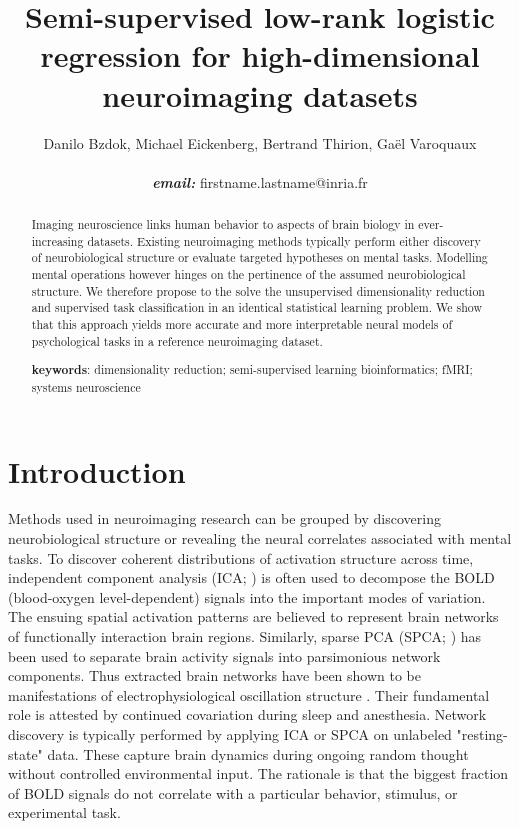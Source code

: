 \documentclass{article} %
\title{Semi-supervised low-rank logistic regression for
high-dimensional neuroimaging datasets}
\begin{document}
\maketitle

\author{Danilo Bzdok, Michael Eickenberg, Bertrand Thirion, Ga\"el
  Varoquaux \\\\\textbf{\textit{email:} }firstname.lastname@inria.fr}

\begin{abstract}
Imaging neuroscience links human behavior to aspects of brain
biology in ever-increasing datasets.
%
Existing neuroimaging methods typically perform either discovery of
neurobiological structure or evaluate targeted hypotheses on mental tasks.
%
Modelling mental operations however hinges
on the pertinence of the assumed neurobiological structure.
%
We therefore propose to the solve the unsupervised dimensionality reduction
and supervised task classification in
an identical statistical learning problem.
%
We show that this approach yields more accurate and more interpretable
neural models of psychological tasks in a reference neuroimaging dataset.
%

\textbf{keywords}: dimensionality reduction; semi-supervised learning
bioinformatics; fMRI; systems neuroscience

\end{abstract}


\section{Introduction}
%
Methods used in neuroimaging research can be grouped by discovering
neurobiological structure or revealing the neural correlates associated
with mental tasks.
To discover coherent distributions of activation structure across time,
independent component analysis (ICA; \cite{beckmann2005}) is often used
to decompose the BOLD (blood-oxygen level-dependent) signals into the
important modes of variation.
The ensuing spatial activation patterns are believed to represent
brain networks of
functionally interaction brain regions.
Similarly, sparse PCA (SPCA; \cite{varoqu2011}) has been used to
separate brain activity signals into parsimonious network components.
Thus extracted brain networks have been shown to be
manifestations of electrophysiological oscillation structure \cite{hipp15}.
Their fundamental role is
attested by continued covariation during sleep and anesthesia.
%
Network discovery is typically performed by applying ICA or SPCA on
unlabeled "resting-state" data. These capture brain dynamics
during ongoing random thought without controlled environmental input.
The rationale is that the biggest fraction of BOLD signals do
not correlate with a particular behavior, stimulus, or experimental task. 
\end{document}
